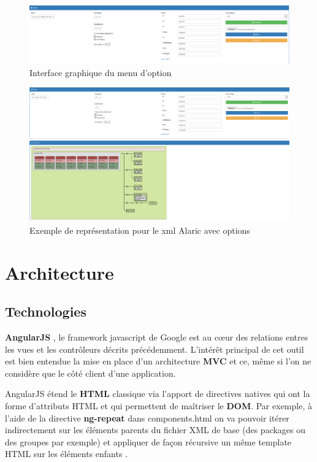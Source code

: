 \documentclass [a4paper,11pt]{article}
\begin{document}
\begin{figure}[!h]
\centering
\includegraphics[scale=0.3]{img/filtre.png}
\caption[Résultats]{ Interface graphique du menu d'option }
\end{figure}

\begin{figure}[!h]
\centering
\includegraphics[scale=0.3]{img/alaric_modif.png}
\caption[Résultats]{Exemple de représentation pour le xml Alaric avec options}
\end{figure}

\newpage

\section{Architecture}

\subsection{Technologies}
\textbf{AngularJS} \cite{angular}, le framework javascript de Google est au cœur des relations entres les vues et les contrôleurs décrits précédemment. L’intérêt principal de cet outil est bien entendue la mise en place d’un architecture \textbf{MVC} et ce, même si l’on ne considère que le côté client d’une application.
\newline

AngularJS étend le \textbf{HTML} classique via l’apport de directives natives qui ont la forme d’attributs HTML et qui permettent de maîtriser le \textbf{DOM}. Par exemple, à l’aide de la directive \textbf{ng-repeat} dans components.html on va pouvoir itérer indirectement sur les éléments parents du fichier XML de base (des packages ou des groupes par exemple) et appliquer de façon récursive un même template HTML sur les éléments enfants \cite{Foster14}.
\newline
\end{document}
